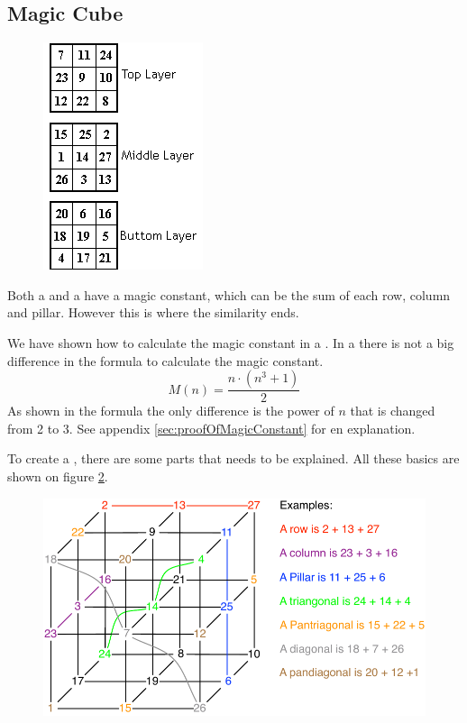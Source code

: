 \subsection{Magic Cube}

\begin{figure}[h]
	\centering
		\includegraphics[scale=0.8]{input/pics/presentMagicCube2}
	\caption{}
	\label{fig:presentMagicCube}
\end{figure}

Both a \msqaure{} and a \mcube{} have a magic constant, which can be the sum of each row, column and pillar. However this is where the similarity ends.

We have shown how to calculate the magic constant in a \msquare{}.
In a  \mcube{} there is not a big difference in the formula to calculate the magic constant.
\begin{equation}
	M(n)=\frac{n \cdot (n^3+1)}{2}
\end{equation}
As shown in the formula the only difference is the power of $n$ that is changed from 2 to 3.
See appendix \ref{sec:proofOfMagicConstant} for en explanation.

To create a  \mcube{}, there are some parts that needs to be explained.
All these basics are shown on figure \ref{fig:cubeparts}.

\begin{figure}[h]
	\centering
		\includegraphics[scale=0.3]{input/pics/cubeparts}
	\caption{}
	\label{fig:cubeparts}
\end{figure}

